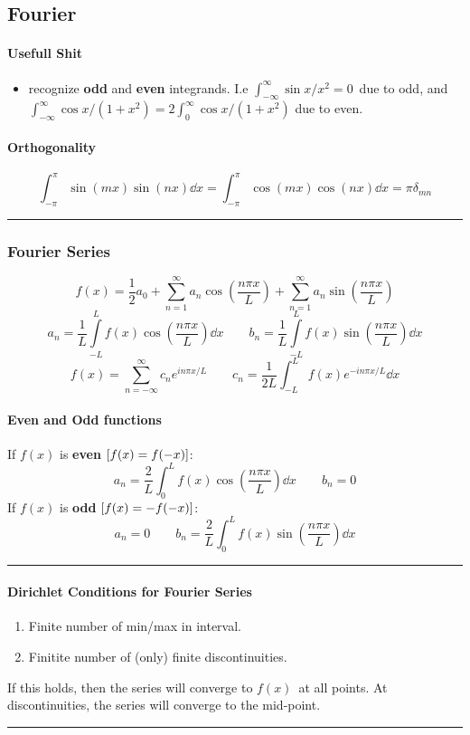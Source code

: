 \documentclass[10pt,a4paper]{article}
\renewcommand{\b}{\textbf}
\renewcommand{\exp}{e^}
\newcommand{\infint}{\int_{-\infty}^{\infty}}
\newcommand{\zeroinfint}{\int_{0}^{\infty}}
\newcommand{\oneinfsum}{\sum_{n=1}^{\infty}}
\newcommand{\holine}[1][\medskipamount]{\par\vspace*{\dimexpr-\parskip-\baselineskip+#1}\noindent\rule{\linewidth}{1pt}\par\vspace*{\dimexpr-\parskip-.5\baselineskip+#1}}
\newcommand{\half}{\frac{1}{2}}
\begin{document}
\begin{multicols}{2}
\part*{Fourier}
\subsection*{Usefull Shit}
\begin{itemize}
    \item recognize \textbf{odd} and \textbf{even} integrands. I.e $\infint \sin{x}/x^2 = 0$ due to odd, and $\infint\cos{x}/(1+x^2) = 2\zeroinfint\cos{x}/(1+x^2)$ due to even.
\end{itemize}

\subsection*{Orthogonality}
\[
    \int_{-\pi}^\pi \sin(mx)\sin(nx) \dd{x} = \int_{-\pi}^\pi \cos(mx)\cos(nx) \dd{x} = \pi \delta_{mn}
\]


\holine
\section*{Fourier Series}
\[
    f(x) = \half a_0 + \oneinfsum a_n\cos(\frac{n\pi x}{L}) + \oneinfsum a_n\sin(\frac{n\pi x}{L})
\]
\[
    a_n = \frac{1}{L}\int\limits_{-L}^{L}f(x) \cos(\frac{n\pi x}{L}) \dd{x} \quad\quad
    b_n = \frac{1}{L}\int\limits_{-L}^{L}f(x) \sin(\frac{n\pi x}{L}) \dd{x}
\]
\[
    f(x) = \sum_{n=-\infty}^{\infty} c_n \exp{in\pi x/L}  \quad\quad
    c_n = \frac{1}{2L}\int_{-L}^L f(x) \exp{-in\pi x/L} \dd{x}
\]

\subsection*{Even and Odd functions}
If $f(x)$ is \b{even} $\qty[f(x) = f(-x)]$:
\[
    a_n = \frac{2}{L}\int_0^L f(x)\cos(\frac{n\pi x}{L}) \dd{x} \quad\quad b_n = 0
\]
If $f(x)$ is \b{odd} $\qty[f(x) = -f(-x)]$:
\[
    a_n = 0 \quad\quad b_n = \frac{2}{L}\int_0^L f(x)\sin(\frac{n\pi x}{L}) \dd{x}
\]


\holine 
\subsection*{Dirichlet Conditions for Fourier Series}
\begin{enumerate}
    \item Finite number of min/max in interval.
    \item Finitite number of (only) finite discontinuities.
\end{enumerate}
If this holds, then the series will converge to $f(x)$ at all points. At discontinuities, the series will converge to the mid-point.
\holine

\end{multicols}
\end{document}
